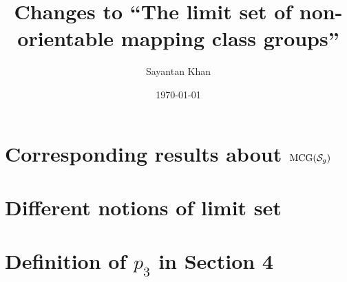 \documentclass[12pt, reqno]{amsart}
\title{Changes to ``The limit set of non-orientable mapping class groups''}
\author{Sayantan Khan}
\date{\today}
\begin{document}
\maketitle

\section{Corresponding results about $\mathrm{MCG}(\mathcal{S}_g)$}
\label{sec:corr-results-about}

\section{Different notions of limit set}
\label{sec:diff-noti-limit}

\section{Definition of $p_3$ in Section 4}
\label{sec:defin-p_3-sect}
\end{document}
